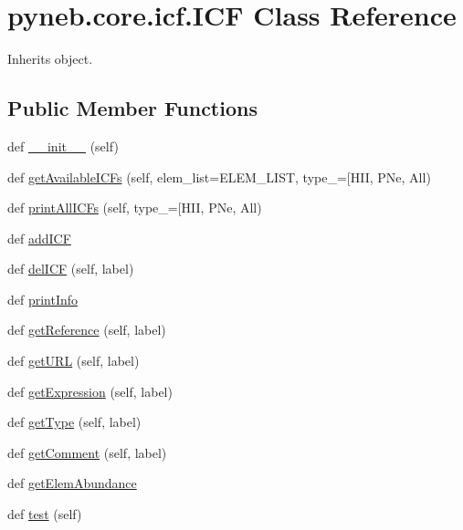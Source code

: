 \hypertarget{classpyneb_1_1core_1_1icf_1_1_i_c_f}{}\section{pyneb.\+core.\+icf.\+I\+C\+F Class Reference}
\label{classpyneb_1_1core_1_1icf_1_1_i_c_f}


Inherits object.

\subsection*{Public Member Functions}
\begin{DoxyCompactItemize}
\item 
def \hyperlink{classpyneb_1_1core_1_1icf_1_1_i_c_f_a4128a511608f5e938e503b7789fd9331}{\+\_\+\+\_\+init\+\_\+\+\_\+} (self)
\item 
def \hyperlink{classpyneb_1_1core_1_1icf_1_1_i_c_f_a45f65185e75b6f98d08656c918385b38}{get\+Available\+I\+C\+Fs} (self, elem\+\_\+list=E\+L\+E\+M\+\_\+\+L\+I\+S\+T, type\+\_\+=\mbox{[}\textquotesingle{}H\+I\+I\textquotesingle{}, P\+Ne, All)
\item 
def \hyperlink{classpyneb_1_1core_1_1icf_1_1_i_c_f_a3b52e8d7dd5bb7a5a667cba328d9af7f}{print\+All\+I\+C\+Fs} (self, type\+\_\+=\mbox{[}\textquotesingle{}H\+I\+I\textquotesingle{}, P\+Ne, All)
\item 
def \hyperlink{classpyneb_1_1core_1_1icf_1_1_i_c_f_a73cd32a765aaeaf1ac3dac231e9f0a72}{add\+I\+C\+F}
\item 
def \hyperlink{classpyneb_1_1core_1_1icf_1_1_i_c_f_a96966ef4b9dba4472c0d865b143b8240}{del\+I\+C\+F} (self, label)
\item 
def \hyperlink{classpyneb_1_1core_1_1icf_1_1_i_c_f_a156850dec8c7457034434b3080c9a517}{print\+Info}
\item 
def \hyperlink{classpyneb_1_1core_1_1icf_1_1_i_c_f_a6dd48b2037e45deb624effc6ac91c841}{get\+Reference} (self, label)
\item 
def \hyperlink{classpyneb_1_1core_1_1icf_1_1_i_c_f_a838ffba1ba395f7039a8f80eab6c46d2}{get\+U\+R\+L} (self, label)
\item 
def \hyperlink{classpyneb_1_1core_1_1icf_1_1_i_c_f_ad620cb1c02943f4be858ca9f3d3d8300}{get\+Expression} (self, label)
\item 
def \hyperlink{classpyneb_1_1core_1_1icf_1_1_i_c_f_aac6e143db503b68856b979c07f770b81}{get\+Type} (self, label)
\item 
def \hyperlink{classpyneb_1_1core_1_1icf_1_1_i_c_f_a0a07d882935f470f4c51af82ed785217}{get\+Comment} (self, label)
\item 
def \hyperlink{classpyneb_1_1core_1_1icf_1_1_i_c_f_a30b52d6d1ec148fba7c0a15cad653f61}{get\+Elem\+Abundance}
\item 
def \hyperlink{classpyneb_1_1core_1_1icf_1_1_i_c_f_aa86aa126db5e94b56ccf995465858f72}{test} (self)
\end{DoxyCompactItemize}
